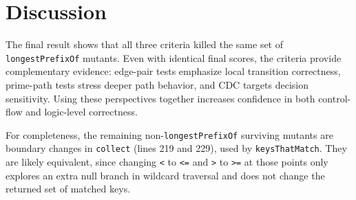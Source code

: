 \section{Discussion}

The final result shows that all three criteria killed the same set of \texttt{longestPrefixOf} mutants.
Even with identical final scores, the criteria provide complementary evidence: edge-pair tests emphasize local transition correctness, prime-path tests stress deeper path behavior, and CDC targets decision sensitivity.
Using these perspectives together increases confidence in both control-flow and logic-level correctness.

For completeness, the remaining non-\texttt{longestPrefixOf} surviving mutants are boundary changes in
\texttt{collect} (lines 219 and 229), used by \texttt{keysThatMatch}.
They are likely equivalent, since changing \texttt{<} to \texttt{<=} and \texttt{>} to \texttt{>=} at those points only explores an extra null branch in wildcard traversal and does not change the returned set of matched keys.